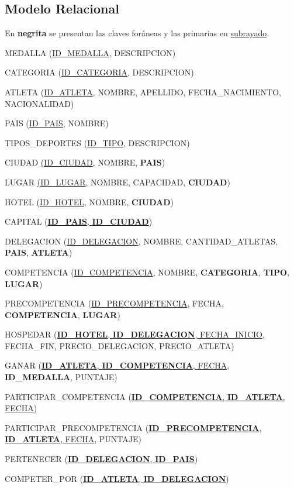 \documentclass[12pt]{article}
\begin{document}
\subsection{Modelo Relacional}
\label{sec:mr}
\begin{center}
    En \textbf{negrita} se presentan las claves foráneas y las primarias en \underline{subrayado}.\smallskip
\end{center}\bigskip
{\scriptsize
\noindent
MEDALLA (\underline{ID\_MEDALLA}, DESCRIPCION)\bigskip

\noindent
CATEGORIA (\underline{ID\_CATEGORIA}, DESCRIPCION)\bigskip

\noindent
ATLETA (\underline{ID\_ATLETA}, NOMBRE, APELLIDO, FECHA\_NACIMIENTO, NACIONALIDAD)\bigskip

\noindent
PAIS (\underline{ID\_PAIS}, NOMBRE)\bigskip

\noindent
TIPOS\_DEPORTES (\underline{ID\_TIPO}, DESCRIPCION)\bigskip

\noindent
CIUDAD \underline{(ID\_CIUDAD}, NOMBRE, \textbf{PAIS})\bigskip

\noindent
LUGAR \underline{(ID\_LUGAR}, NOMBRE, CAPACIDAD, \textbf{CIUDAD})\bigskip

\noindent
HOTEL (\underline{ID\_HOTEL}, NOMBRE, \textbf{CIUDAD})\bigskip

\noindent
CAPITAL (\underline{\textbf{ID\_PAIS}, \textbf{ID\_CIUDAD}})\bigskip

\noindent
DELEGACION (\underline{ID\_DELEGACION}, NOMBRE, CANTIDAD\_ATLETAS, \textbf{PAIS}, \textbf{ATLETA})\bigskip

\noindent
COMPETENCIA (\underline{ID\_COMPETENCIA}, NOMBRE, \textbf{CATEGORIA}, \textbf{TIPO}, \textbf{LUGAR})\bigskip

\noindent
PRECOMPETENCIA (\underline{ID\_PRECOMPETENCIA}, FECHA, \textbf{COMPETENCIA}, \textbf{LUGAR})\bigskip

\noindent
HOSPEDAR (\underline{\textbf{ID\_HOTEL}, \textbf{ID\_DELEGACION}, FECHA\_INICIO}, FECHA\_FIN, PRECIO\_DELEGACION, PRECIO\_ATLETA)\bigskip

\noindent
GANAR (\underline{\textbf{ID\_ATLETA}, \textbf{ID\_COMPETENCIA}, FECHA}, \textbf{ID\_MEDALLA}, PUNTAJE)\bigskip

\noindent
PARTICIPAR\_COMPETENCIA (\underline{\textbf{ID\_COMPETENCIA}, \textbf{ID\_ATLETA}, FECHA})\bigskip

\noindent
PARTICIPAR\_PRECOMPETENCIA (\underline{\textbf{ID\_PRECOMPETENCIA}, \textbf{ID\_ATLETA}, FECHA}, PUNTAJE)\bigskip

\noindent
PERTENECER (\underline{\textbf{ID\_DELEGACION}, \textbf{ID\_PAIS}})\bigskip

\noindent
COMPETER\_POR (\underline{\textbf{ID\_ATLETA}, \textbf{ID\_DELEGACION}})
}
\end{document}
